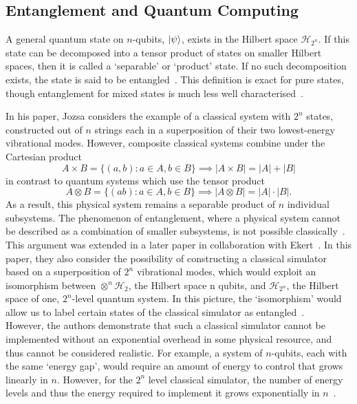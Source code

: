 \documentclass{standalone}
\begin{document}
\subsection{Entanglement and Quantum Computing}\label{sec:entanglement}
A general quantum state on $n$-qubits, $\ket{\psi}$, exists in the Hilbert space $\mathcal{H}_{2^{n}}$. If this state can be decomposed into a tensor product of states on smaller Hilbert spaces, then it is called a `separable' or `product' state. If no such decomposition exists, the state is said to be entangled~\cite{Nielsen2000}. This definition is exact for pure states, though entanglement for mixed states is much less well characterised~\cite{Laflamme2001}. 
\par
In his paper, Jozsa considers the example of a classical system with $2^{n}$ states, constructed out of $n$ strings each in a superposition of their two lowest-energy vibrational modes. However, composite classical systems combine under the Cartesian product~\cite{Jozsa1997}
\begin{equation}
    A\times B = \{(a,b) : a\in A, b\in B\} \implies \left| A\times B\right| = \left|A\right| + \left|B\right|
\end{equation}
 in contrast to quantum systems which use the tensor product~\cite{Nielsen2000}
\begin{equation}
    A\otimes B = \{(ab) : a\in A, b\in B\} \implies \left|A\otimes B\right| = \left|A\right|\cdot\left|B\right|.
\end{equation}
As a result, this physical system remains a separable product of $n$ individual subsystems. The phenomenon of entanglement, where a physical system cannot be described as a combination of smaller subsystems, is not possible classically~\cite{Jozsa1997}. \\
This argument was extended in a later paper in collaboration with Ekert~\cite{Ekert1998}. In this paper, they also consider the possibility of constructing a classical simulator based on a superposition of $2^{n}$ vibrational modes, which would exploit an isomorphism between $\otimes^{n}\mathcal{H}_{2}$, the Hilbert space n qubits, and $\mathcal{H}_{2^{n}}$, the Hilbert space of one, $2^{n}$-level quantum system. In this picture, the `isomorphism' would allow us to label certain states of the classical simulator as entangled~\cite{Ekert1998}. \\
However, the authors demonstrate that such a classical simulator cannot be implemented without an exponential overhead in some physical resource, and thus cannot be considered realistic. For example, a system of $n$-qubits, each with the same `energy gap', would require an amount of energy to control that grows linearly in $n$. However, for the $2^{n}$ level classical simulator, the number of energy levels and thus the energy required to implement it grows exponentially in $n$~\cite{Ekert1998}.\\
\end{document}
